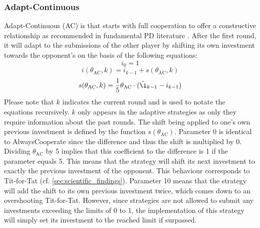 \documentclass[11pt]{article}
\begin{document}
\subsubsection*{Adapt-Continuous}
Adapt-Continuous (AC) is that starts with full cooperation to offer a constructive relationship as recommended in fundamental PD literature \cite{RC15, Kuh25}.
After the first round, it will adapt to the submissions of the other player by shifting its own investment towards the opponent's on the basis of the following equations:
\begin{equation}
	i_0 = 1
	\label{eq:AC_i0}
\end{equation}
\begin{equation}
	i(\theta_{\mathrm{AC}}, k) = i_{k-1} + s(\theta_{\mathrm{AC}}, k)
	\label{eq:AC_i_eq}
\end{equation}
\begin{equation}
	s(\theta_{\mathrm{AC}}, k) = \frac{1}{5} \theta_{\mathrm{AC}} \cdot (\tilde{\i}_{k-1} - i_{k-1})
	\label{eq:AC_s_eq}
\end{equation}
Please note that $k$ indicates the current round and is used to notate the equations recursively.
$k$ only appears in the adaptive strategies as only they require information about the past rounds.
The shift being applied to one's own previous investment is defined by the function $s(\theta_{\mathrm{AC}})$.
Parameter 0 is identical to AlwaysCooperate since the difference and thus the shift is multiplied by 0.
Dividing $\theta_{\mathrm{AC}}$ by 5 implies that this coefficient to the difference is 1 if the parameter equals 5.
This means that the strategy will shift its next investment to exactly the previous investment of the opponent.
This behaviour corresponds to Tit-for-Tat (cf. \ref{sec:scientific_findings}).
Parameter 10 means that the strategy will add the shift to its own previous investment twice, which comes down to an overshooting Tit-for-Tat.
However, since strategies are not allowed to submit any investments exceeding the limits of 0 to 1, the implementation of this strategy will simply set its investment to the reached limit if surpassed.
\end{document}
